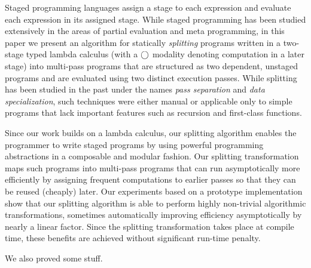 Staged programming languages assign a stage to each expression and
evaluate each expression in its assigned stage.
While staged programming has been studied extensively in the areas of
partial evaluation and meta programming, in this paper we present an
algorithm for statically {\em splitting} programs written in a
two-stage typed lambda calculus (with a $\bigcirc$ modality denoting
computation in a later stage) into multi-pass programs that are
structured as two dependent, unstaged programs and are evaluated using
two distinct execution passes.  While splitting has been studied in the past
under the names \emph{pass separation} and \emph{data specialization},
such techniques were either manual or applicable only to simple programs
that lack important features such as recursion and first-class
functions.

Since our work builds on a lambda calculus, our splitting algorithm
enables the programmer to write staged programs by using powerful
programming abstractions in a composable and modular fashion. Our
splitting transformation maps such programs into multi-pass programs
that can run asymptotically more efficiently by assigning frequent
computations to earlier passes so that they can be reused (cheaply)
later.  Our experiments based on a prototype implementation show that
our splitting algorithm is able to perform highly non-trivial algorithmic
transformations, sometimes automatically improving efficiency
asymptotically by nearly a linear factor.  Since the splitting
transformation takes place at compile time, these benefits are
achieved without significant run-time penalty.

\TODO We also proved some stuff.





